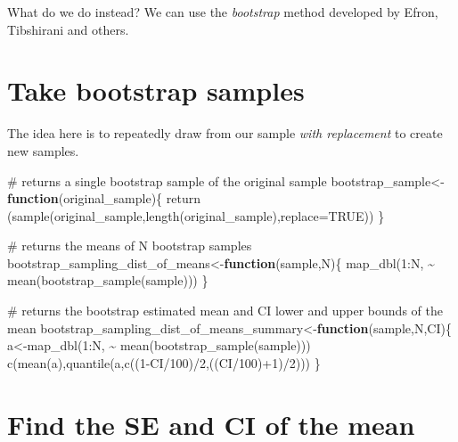 \documentclass[
  letterpaper,
  DIV=11,
  numbers=noendperiod]{scrreprt}
\newenvironment{Shaded}{\begin{snugshade}}{\end{snugshade}}
\newcommand{\AttributeTok}[1]{\textcolor[rgb]{0.40,0.45,0.13}{#1}}
\newcommand{\CommentTok}[1]{\textcolor[rgb]{0.37,0.37,0.37}{#1}}
\newcommand{\ConstantTok}[1]{\textcolor[rgb]{0.56,0.35,0.01}{#1}}
\newcommand{\ControlFlowTok}[1]{\textcolor[rgb]{0.00,0.23,0.31}{\textbf{#1}}}
\newcommand{\DecValTok}[1]{\textcolor[rgb]{0.68,0.00,0.00}{#1}}
\newcommand{\FunctionTok}[1]{\textcolor[rgb]{0.28,0.35,0.67}{#1}}
\newcommand{\NormalTok}[1]{\textcolor[rgb]{0.00,0.23,0.31}{#1}}
\newcommand{\OtherTok}[1]{\textcolor[rgb]{0.00,0.23,0.31}{#1}}
\newcommand{\SpecialCharTok}[1]{\textcolor[rgb]{0.37,0.37,0.37}{#1}}
\begin{document}
What do we do instead? We can use the \emph{bootstrap} method developed
by Efron, Tibshirani and others.

\section{Take bootstrap samples}\label{take-bootstrap-samples}

The idea here is to repeatedly draw from our sample \emph{with
replacement} to create new samples.

\begin{Shaded}
\begin{Highlighting}[]
\CommentTok{\# returns a single bootstrap sample of the original sample}
\NormalTok{bootstrap\_sample}\OtherTok{\textless{}{-}}\ControlFlowTok{function}\NormalTok{(original\_sample)\{}
  \FunctionTok{return}\NormalTok{ (}\FunctionTok{sample}\NormalTok{(original\_sample,}\FunctionTok{length}\NormalTok{(original\_sample),}\AttributeTok{replace=}\ConstantTok{TRUE}\NormalTok{))}
\NormalTok{\}}

\CommentTok{\# returns the means of N bootstrap samples}
\NormalTok{bootstrap\_sampling\_dist\_of\_means}\OtherTok{\textless{}{-}}\ControlFlowTok{function}\NormalTok{(sample,N)\{}
  \FunctionTok{map\_dbl}\NormalTok{(}\DecValTok{1}\SpecialCharTok{:}\NormalTok{N, }\SpecialCharTok{\textasciitilde{}} \FunctionTok{mean}\NormalTok{(}\FunctionTok{bootstrap\_sample}\NormalTok{(sample)))}
\NormalTok{\}}

\CommentTok{\# returns the bootstrap estimated mean and CI lower and upper bounds of the mean}
\NormalTok{bootstrap\_sampling\_dist\_of\_means\_summary}\OtherTok{\textless{}{-}}\ControlFlowTok{function}\NormalTok{(sample,N,CI)\{}
\NormalTok{  a}\OtherTok{\textless{}{-}}\FunctionTok{map\_dbl}\NormalTok{(}\DecValTok{1}\SpecialCharTok{:}\NormalTok{N, }\SpecialCharTok{\textasciitilde{}} \FunctionTok{mean}\NormalTok{(}\FunctionTok{bootstrap\_sample}\NormalTok{(sample)))}
  \FunctionTok{c}\NormalTok{(}\FunctionTok{mean}\NormalTok{(a),}\FunctionTok{quantile}\NormalTok{(a,}\FunctionTok{c}\NormalTok{((}\DecValTok{1}\SpecialCharTok{{-}}\NormalTok{CI}\SpecialCharTok{/}\DecValTok{100}\NormalTok{)}\SpecialCharTok{/}\DecValTok{2}\NormalTok{,((CI}\SpecialCharTok{/}\DecValTok{100}\NormalTok{)}\SpecialCharTok{+}\DecValTok{1}\NormalTok{)}\SpecialCharTok{/}\DecValTok{2}\NormalTok{)))}
\NormalTok{\}}
\end{Highlighting}
\end{Shaded}

\section{Find the SE and CI of the
mean}\label{find-the-se-and-ci-of-the-mean}
\end{document}
